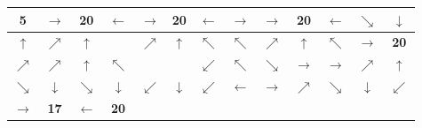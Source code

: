 \begin{center}
\begin{minipage}{\textwidth}
\renewcommand{\arraystretch}{1.4}
\begin{table}[H]
\centering 
\begin{scriptsize}
\begin{tabular}{|>{}c|>{}c|>{}c|>{}c|>{}c|>{}c|>{}c|>{}c|>{}c|>{}c|>{}c|>{}c|>{}c|}
\hline
\bf{5}&\cellcolor{red!15!white}$\rightarrow$&\cellcolor{red!15!white}\bf{20}&\cellcolor{red!15!white}$\leftarrow$&
\cellcolor{blue!15!white}$\rightarrow$&\cellcolor{blue!15!white}\bf{20}&\cellcolor{blue!15!white}$\leftarrow$&\cellcolor{green!15!white}$\rightarrow$&\cellcolor{green!15!white}$\rightarrow$&\cellcolor{green!15!white}\bf{20}&\cellcolor{green!15!white}$\leftarrow$&\cellcolor{yellow!15!white}$\searrow$&\cellcolor{yellow!15!white}$\downarrow$\\
\hline
$\uparrow$&\cellcolor{red!15!white}$\nearrow$&\cellcolor{red!15!white}$\uparrow$&\cellcolor{gray!50!white} &
\cellcolor{blue!15!white}$\nearrow$&\cellcolor{blue!15!white}$\uparrow$&\cellcolor{blue!15!white}$\nwarrow$&\cellcolor{blue!15!white}$\nwarrow$&\cellcolor{green!15!white}$\nearrow$&
\cellcolor{green!15!white}$\uparrow$&\cellcolor{green!15!white}$\nwarrow$&\cellcolor{yellow!15!white}$\rightarrow$&\cellcolor{yellow!15!white}\bf{20} \\
\hline
\cellcolor{red!15!white}$\nearrow$&\cellcolor{red!15!white}$\nearrow$&\cellcolor{red!15!white}$\uparrow$&\cellcolor{red!15!white}$\nwarrow$&
\cellcolor{gray!50!white} &\cellcolor{gray!50!white} &\cellcolor{red!15!white}$\swarrow$ &\cellcolor{blue!15!white}$\nwarrow$&\cellcolor{yellow!15!white}$\searrow$ &\cellcolor{yellow!15!white}$\rightarrow$&\cellcolor{yellow!15!white}$\rightarrow$&\cellcolor{yellow!15!white}$\nearrow$&\cellcolor{yellow!15!white}$\uparrow$\\
\hline
\cellcolor{green!15!white}$\searrow$&\cellcolor{green!15!white}$\downarrow$&\cellcolor{blue!15!white}$\searrow$&\cellcolor{blue!15!white}$\downarrow$&\cellcolor{blue!15!white}
$\swarrow$&\cellcolor{red!15!white}$\downarrow$&\cellcolor{red!15!white}$\swarrow$&\cellcolor{red!15!white}$\leftarrow$&\cellcolor{yellow!15!white}$\rightarrow$&\cellcolor{yellow!15!white}$\nearrow$ 
&\cellcolor{green!15!white}$\searrow$&\cellcolor{green!15!white}$\downarrow$&\cellcolor{green!15!white}$\swarrow$ \\
\hline
\cellcolor{green!15!white}$\rightarrow$&\cellcolor{green!15!white}\bf{17}&\cellcolor{green!15!white}$\leftarrow$&\cellcolor{blue!15!white}\bf{20}&

\end{tabular}
\end{scriptsize}
\end{table}
\end{minipage}
\end{center}
